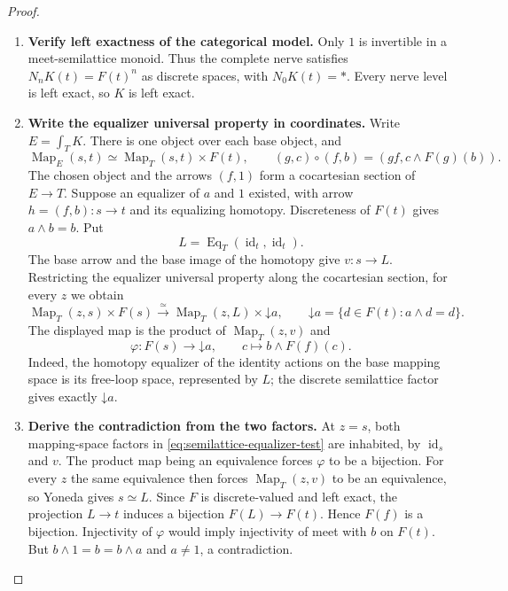 \documentclass[oneside]{article}
\theoremstyle{plain}
\theoremstyle{definition}
\theoremstyle{remark}
\newcommand{\Eq}{\operatorname{Eq}}
\newcommand{\Map}{\operatorname{Map}}
\newcommand{\id}{\operatorname{id}}
\begin{document}
\begin{proof}
\leavevmode
\begin{enumerate}
\item \textbf{Verify left exactness of the categorical model.}
Only $1$ is invertible in a meet-semilattice monoid. Thus the complete
nerve satisfies $N_nK(t)=F(t)^n$ as discrete spaces, with $N_0K(t)=*$.
Every nerve level is left exact, so $K$ is left exact.


\item \textbf{Write the equalizer universal property in coordinates.}
Write $E=\int_TK$. There is one object over each base object, and
\[
 \Map_E(s,t)\simeq\Map_T(s,t)\times F(t),
 \qquad
 (g,c)\circ(f,b)=(gf,c\wedge F(g)(b)).
\]
The chosen object and the arrows $(f,1)$ form a cocartesian section of
$E\to T$. Suppose an equalizer of $a$ and $1$ existed, with arrow
$h=(f,b):s\to t$ and its equalizing homotopy. Discreteness of $F(t)$
gives $a\wedge b=b$. Put
\[
 L=\Eq_T(\id_t,\id_t).
\]
The base arrow and the base image of the homotopy give $v:s\to L$.
Restricting the equalizer universal property along the cocartesian
section, for every $z$ we obtain
\begin{equation}\label{eq:semilattice-equalizer-test}
 \Map_T(z,s)\times F(s)
 \xrightarrow{\simeq}
 \Map_T(z,L)\times\mathord\downarrow a,
 \qquad
 \mathord\downarrow a=\{d\in F(t):a\wedge d=d\}.
\end{equation}
The displayed map is the product of $\Map_T(z,v)$ and
\[
 \varphi:F(s)\to\mathord\downarrow a,
 \qquad c\longmapsto b\wedge F(f)(c).
\]
Indeed, the homotopy equalizer of the identity actions on the base
mapping space is its free-loop space, represented by $L$; the discrete
semilattice factor gives exactly $\mathord\downarrow a$.


\item \textbf{Derive the contradiction from the two factors.}
At $z=s$, both mapping-space factors in
\eqref{eq:semilattice-equalizer-test} are inhabited, by $\id_s$ and
$v$. The product map being an equivalence forces $\varphi$ to be a
bijection. For every $z$ the same equivalence then forces
$\Map_T(z,v)$ to be an equivalence, so Yoneda gives $s\simeq L$.
Since $F$ is discrete-valued and left exact, the projection $L\to t$
induces a bijection $F(L)\to F(t)$. Hence $F(f)$ is a bijection.
Injectivity of $\varphi$ would imply injectivity of meet with $b$ on
$F(t)$. But $b\wedge1=b=b\wedge a$ and $a\ne1$, a contradiction.
\qedhere
\end{enumerate}
\end{proof}
\end{document}

